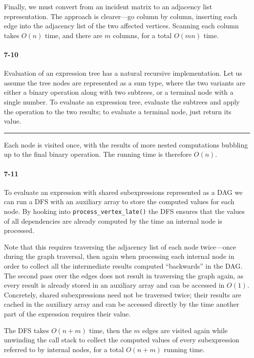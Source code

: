 \documentclass{report}
\newcommand{\li}{\lstinline}
\newcommand{\okthen}{\rule[-1.4pt]{0.3em}{0.77em}}
\begin{document}
\medskip

Finally, we must convert from an incident matrix to an adjacency list representation. The approach is clearer---go column by column, inserting each edge into the adjacency list of the two affected vertices. Scanning each column takes $O(n)$ time, and there are $m$ columns, for a total $O(mn)$ time.

\paragraph{7-10} Evaluation of an expression tree has a natural recursive implementation. Let us assume the tree nodes are represented as a sum type, where the two variants are either a binary operation along with two subtrees, or a terminal node with a single number. To evaluate an expression tree, evaluate the subtrees and apply the operation to the two results; to evaluate a terminal node, just return its value.\ \okthen

Each node is visited once, with the results of more nested computations bubbling up to the final binary operation. The running time is therefore $O(n)$.

\paragraph{7-11} To evaluate an expression with shared subexpressions represented as a DAG we can run a DFS with an auxiliary array to store the computed values for each node. By hooking into \li!process_vertex_late()! the DFS ensures that the values of all dependencies are already computed by the time an internal node is processed.

Note that this requires traversing the adjacency list of each node twice---once during the graph traversal, then again when processing each internal node in order to collect all the intermediate results computed ``backwards'' in the DAG. The second pass over the edges does not result in traversing the graph again, as every result is already stored in an auxiliary array and can be accessed in $O(1)$. Concretely, shared subexpressions need not be traversed twice; their results are cached in the auxiliary array and can be accessed directly by the time another part of the expression requires their value.

The DFS takes $O(n+m)$ time, then the $m$ edges are visited again while unwinding the call stack to collect the computed values of every subexpression referred to by internal nodes, for a total $O(n+m)$ running time.
\end{document}
